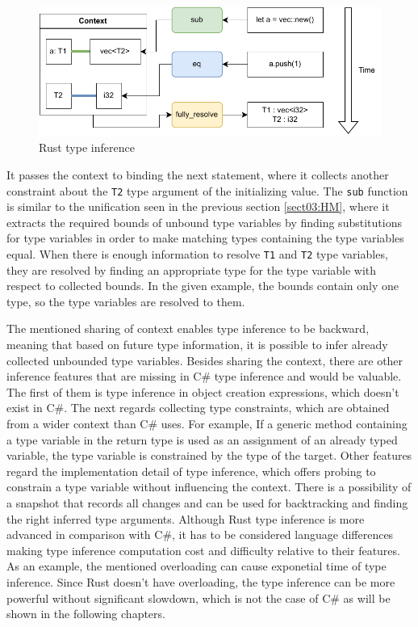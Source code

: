 \begin{figure}[h]
\centering
\includegraphics[width=140mm]{./img/RustTypeInference.pdf}
\caption{Rust type inference}
\label{img18:rustTypeInference}
\end{figure}
It passes the context to binding the next statement, where it collects another constraint about the \texttt{T2} type argument of the initializing value.
The \texttt{sub} function is similar to the unification seen in the previous section \ref{sect03:HM}, where it extracts the required bounds of unbound type variables by finding substitutions for type variables in order to make matching types containing the type variables equal.
When there is enough information to resolve \texttt{T1} and \texttt{T2} type variables, they are resolved by finding an appropriate type for the type variable with respect to collected bounds.
In the given example, the bounds contain only one type, so the type variables are resolved to them.
\par
The mentioned sharing of context enables type inference to be backward, meaning that based on future type information, it is possible to infer already collected unbounded type variables. 
Besides sharing the context, there are other inference features that are missing in C\# type inference and would be valuable. 
The first of them is type inference in object creation expressions, which doesn't exist in C\#. 
The next regards collecting type constraints, which are obtained from a wider context than C\# uses. 
For example, If a generic method containing a type variable in the return type is used as an assignment of an already typed variable, the type variable is constrained by the type of the target. Other features regard the implementation detail of type inference, which offers probing to constrain a type variable without influencing the context. 
There is a possibility of a snapshot that records all changes and can be used for backtracking and finding the right inferred type arguments.
Although Rust type inference is more advanced in comparison with C\#, it has to be considered language differences making type inference computation cost and difficulty relative to their features. 
As an example, the mentioned overloading can cause exponetial time of type inference. 
Since Rust doesn't have overloading, the type inference can be more powerful without significant slowdown, which is not the case of C\# as will be shown in the following chapters.

